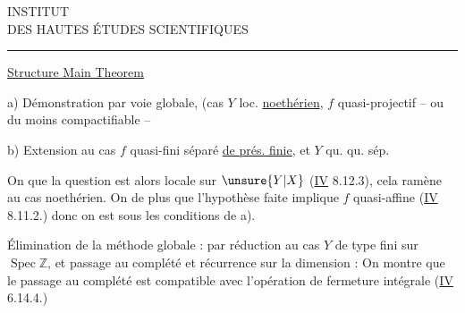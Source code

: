 \begin{center}
INSTITUT\\
DES HAUTES ÉTUDES SCIENTIFIQUES\\
\rule{1.15cm}{0.4pt}
\end{center}

\uline{Structure Main Theorem}

a) Démonstration par voie globale, (cas $Y$ loc. \uline{noethérien}\deleted{\unsure{)|\S{}}}, $f$ quasi-projectif -- ou du moins compactifiable --

b) Extension au cas $f$ quasi-fini séparé \uline{de prés. finie}, et $Y$ qu.  qu. sép.

On  que la question est alors locale sur $\unsure{Y|X}$ (\uline{IV} 8.12.3), cela ramène au cas noethérien. On  de plus que l'hypothèse faite implique $f$ quasi-affine (\uline{IV} 8.11.2.) donc on est sous les conditions de a).

Élimination de la méthode globale : par réduction au cas $Y$  de type fini sur $\operatorname{Spec}\mathbb{Z}$, et passage au complété et récurrence sur la dimension : On montre que le passage au complété est compatible avec l'opération de fermeture intégrale (\uline{IV} 6.14.4.)
